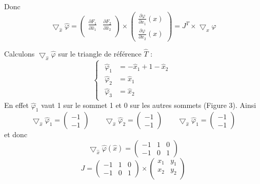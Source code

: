 \documentclass[a4paper,12pt,titlepage]{report}
\begin{document}
\begin{onehalfspace}
\begin{appendix}
Donc
\[ \bigtriangledown_{\hat{x}} \hat{\varphi} = 
\begin{pmatrix}
   \frac{\partial F_{1}}{\partial \hat{x}_{1}} & \frac{\partial F_{2}}{\partial \hat{x}_{2}}\\
\end{pmatrix}
\times 
\begin{pmatrix}
   \frac{\partial \varphi}{\partial x_{1}}(x) \\
   \frac{\partial\varphi}{\partial x_{2}}(x)
\end{pmatrix} = 
J^{T} \times \bigtriangledown_{x} \varphi \]

Calculons $\bigtriangledown_{\hat{x}} \hat{\varphi}$ sur le triangle de référence $\hat{T}$ :
\[
\left\{
\begin{array}{ccc} 
	\begin{aligned}
		\hat{\varphi}_{1} &= -\hat{x}_{1}+1-\hat{x}_{2} \\  %
		\hat{\varphi}_{2} &= \hat{x}_{1}                \\  %
		\hat{\varphi}_{3} &= \hat{x}_{2}
	\end{aligned}
\end{array}
\right.
\]
En effet $\hat{\varphi}_{1}$ vaut 1 sur le sommet 1 et 0 sur les autres sommets (Figure 3).
Ainsi
\[ \bigtriangledown_{\hat{x}} \hat{\varphi}_{1} = 
\begin{pmatrix}
   -1 \\
   -1
\end{pmatrix}
\qquad
\bigtriangledown_{\hat{x}} \hat{\varphi}_{2} = 
\begin{pmatrix}
   -1 \\
   -1
\end{pmatrix}
\qquad
\bigtriangledown_{\hat{x}} \hat{\varphi}_{1} = 
\begin{pmatrix}
   -1 \\
   -1
\end{pmatrix}
\]
et donc
\[
\bigtriangledown_{\hat{x}} \hat{\varphi}(\hat{x}) = 
\begin{pmatrix}
   -1 & 1 & 0 \\
   -1 & 0 & 1 
\end{pmatrix}
\]
\[	
J =
\begin{pmatrix}
   -1 & 1 & 0 \\
   -1 & 0 & 1 
\end{pmatrix}
\times
\begin{pmatrix}
   x_{1} &  y_{1} \\
   x_{2} &  y_{2} \\

\end{pmatrix}\]
\end{appendix}
\end{onehalfspace}
\end{document}
